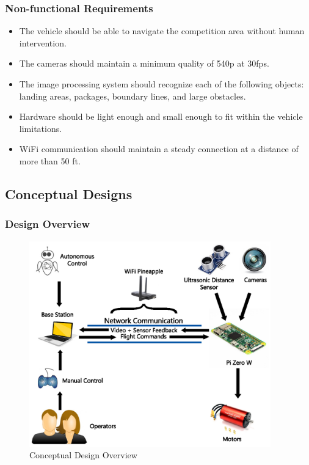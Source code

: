 \documentclass[onecolumn, draftclsnofoot,10pt, compsoc]{IEEEtran}
\begin{document}
\subsubsection{Non-functional Requirements} 

\begin{itemize}
\item{The vehicle should be able to navigate the competition area without human intervention.}
\item{The cameras should maintain a minimum quality of 540p at 30fps.}
\item{The image processing system should recognize each of the following objects: landing areas, packages, boundary lines, and large obstacles.}
\item{Hardware should be light enough and small enough to fit within the vehicle limitations.}
\item{WiFi communication should maintain a steady connection at a distance of more than 50 ft. }
\end{itemize}



\subsection{Conceptual Designs}%


\subsubsection{Design Overview} %

\begin{figure}[ht]
\centering
\includegraphics[height=3.5in]{DesignOverview}
\caption{Conceptual Design Overview}
\end{figure}
\end{document}
